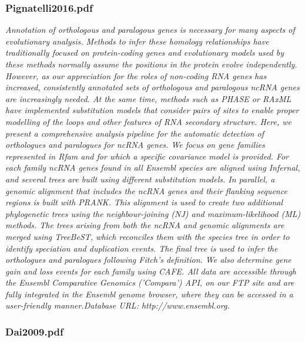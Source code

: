 \documentclass[graybox]{svmult}
\begin{document}
\subsubsection{Pignatelli2016.pdf}
\cite{Pignatelli2016}
\textit{Annotation of orthologous and paralogous genes is necessary for many aspects of evolutionary analysis. Methods to infer these homology relationships have traditionally focused on protein-coding genes and evolutionary models used by these methods normally assume the positions in the protein evolve independently. However, as our appreciation for the roles of non-coding RNA genes has increased, consistently annotated sets of orthologous and paralogous ncRNA genes are increasingly needed. At the same time, methods such as PHASE or RAxML have implemented substitution models that consider pairs of sites to enable proper modelling of the loops and other features of RNA secondary structure. Here, we present a comprehensive analysis pipeline for the automatic detection of orthologues and paralogues for ncRNA genes. We focus on gene families represented in Rfam and for which a specific covariance model is provided. For each family ncRNA genes found in all Ensembl species are aligned using Infernal, and several trees are built using different substitution models. In parallel, a genomic alignment that includes the ncRNA genes and their flanking sequence regions is built with PRANK. This alignment is used to create two additional phylogenetic trees using the neighbour-joining (NJ) and maximum-likelihood (ML) methods. The trees arising from both the ncRNA and genomic alignments are merged using TreeBeST, which reconciles them with the species tree in order to identify speciation and duplication events. The final tree is used to infer the orthologues and paralogues following Fitch's definition. We also determine gene gain and loss events for each family using CAFE. All data are accessible through the Ensembl Comparative Genomics ('Compara') API, on our FTP site and are fully integrated in the Ensembl genome browser, where they can be accessed in a user-friendly manner.Database URL: http://www.ensembl.org.}
\subsubsection{Dai2009.pdf}
\end{document}
